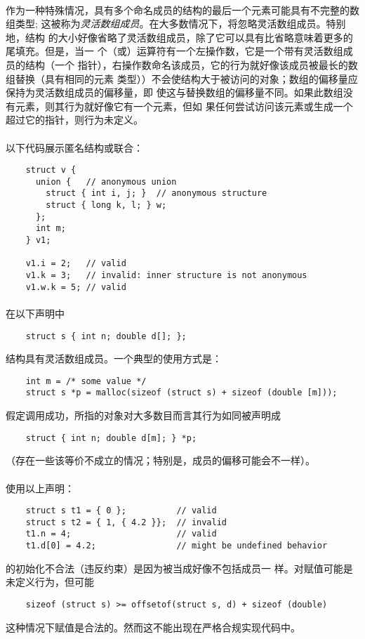 \paragraph{}
作为一种特殊情况，具有多个命名成员的结构的最后一个元素可能具有不完整的数组类型;
这被称为\textit{灵活数组成员}。在大多数情况下，将忽略灵活数组成员。特别地，结构
的大小好像省略了灵活数组成员，除了它可以具有比省略意味着更多的尾填充。但是，当一
个（或\tm{->}）运算符有一个左操作数，它是一个带有灵活数组成员的结构（一个
指针），右操作数命名该成员，它的行为就好像该成员被最长的数组替换（具有相同的元素
类型））不会使结构大于被访问的对象；数组的偏移量应保持为灵活数组成员的偏移量，即
使这与替换数组的偏移量不同。如果此数组没有元素，则其行为就好像它有一个元素，但如
果任何尝试访问该元素或生成一个超过它的指针，则行为未定义。

\paragraph{}
\ex 以下代码展示匿名结构或联合：
\begin{lstlisting}
    struct v {
      union {   // anonymous union
        struct { int i, j; }  // anonymous structure
        struct { long k, l; } w;
      };
      int m;
    } v1;

    v1.i = 2;   // valid
    v1.k = 3;   // invalid: inner structure is not anonymous
    v1.w.k = 5; // valid
\end{lstlisting}

\paragraph{}
\ex 在以下声明中
\begin{lstlisting}
    struct s { int n; double d[]; };
\end{lstlisting}
结构具有灵活数组成员。一个典型的使用方式是：
\begin{lstlisting}
    int m = /* some value */
    struct s *p = malloc(sizeof (struct s) + sizeof (double [m]));
\end{lstlisting}
假定调用成功，所指的对象对大多数目而言其行为如同被声明成
\begin{lstlisting}
    struct { int n; double d[m]; } *p;
\end{lstlisting}
（存在一些该等价不成立的情况；特别是，成员的偏移可能会不一样）。

\paragraph{}
使用以上声明：
\begin{lstlisting}
    struct s t1 = { 0 };          // valid
    struct s t2 = { 1, { 4.2 }};  // invalid
    t1.n = 4;                     // valid
    t1.d[0] = 4.2;                // might be undefined behavior
\end{lstlisting}
的初始化不合法（违反约束）是因为被当成好像不包括成员一
样。对赋值可能是未定义行为，但可能
\begin{lstlisting}
    sizeof (struct s) >= offsetof(struct s, d) + sizeof (double)
\end{lstlisting}
这种情况下赋值是合法的。然而这不能出现在严格合规实现代码中。

